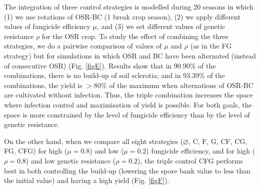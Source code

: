 \documentclass{article}
\begin{document}
The integration of three control strategies is modelled during 20 seasons in which (1) we use rotations of OSR-BC (1 break crop season), (2) we apply different values of fungicide efficiency $\mu$, and (3) we set different values of genetic resistance $\rho$ for the OSR crop. To study the effect of combining the three strategies, we do a pairwise comparison of values of $\mu$ and $\rho$ (as in the FG strategy) but for simulations in which OSR and BC have been alternated (instead of consecutive OSR)  (Fig. \ref{figE}).  Results show that in 90.90\% of the combinations, there is no build-up of soil sclerotia; and in 93.39\% of the combinations, the yield is $>80\%$ of the maximum when alternations of OSR-BC are cultivated without infection. Thus, the triple combination increases the space where infection control and maximisation of yield is possible. For both goals, the space is more constrained by the level of fungicide efficiency than by the level of genetic resistance. 


On the other hand, when we compare all eight strategies ($\varnothing$, C, F, G, CF, CG, FG, CFG) for high ($\mu = 0.8$) and low ($\mu = 0.2$) fungicide efficiency, and for high ($\rho = 0.8$) and low genetic resistance ($\rho = 0.2$), the triple control CFG performs best in both controlling the build-up (lowering the spore bank value to less than the initial value) and having a high yield (Fig. \ref{figF}).
\end{document}
